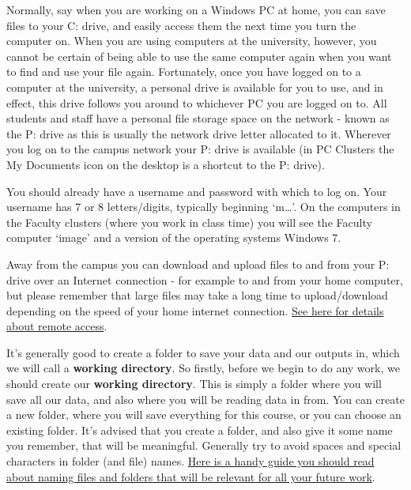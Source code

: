 \documentclass[]{book}
\theoremstyle{definition}
\theoremstyle{definition}
\theoremstyle{definition}
\theoremstyle{remark}
\begin{document}
Normally, say when you are working on a Windows PC at home, you can save
files to your C: drive, and easily access them the next time you turn
the computer on. When you are using computers at the university,
however, you cannot be certain of being able to use the same computer
again when you want to find and use your file again. Fortunately, once
you have logged on to a computer at the university, a personal drive is
available for you to use, and in effect, this drive follows you around
to whichever PC you are logged on to. All students and staff have a
personal file storage space on the network - known as the P: drive as
this is usually the network drive letter allocated to it. Wherever you
log on to the campus network your P: drive is available (in PC Clusters
the My Documents icon on the desktop is a shortcut to the P: drive).

You should already have a username and password with which to log on.
Your username has 7 or 8 letters/digits, typically beginning
`m\ldots{}'. On the computers in the Faculty clusters (where you work in
class time) you will see the Faculty computer `image' and a version of
the operating systems Windows 7.

Away from the campus you can download and upload files to and from your
P: drive over an Internet connection - for example to and from your home
computer, but please remember that large files may take a long time to
upload/download depending on the speed of your home internet connection.
\href{http://servicedesk.manchester.ac.uk/portal/app/portlets/results/viewsolution.jsp?solutionid=040918305513985\&SToken=A9F6241A4BCC47E813D7C92C68B579F7}{See
here for details about remote access}.

It's generally good to create a folder to save your data and our outputs
in, which we will call a \textbf{working directory}. So firstly, before
we begin to do any work, we should create our \textbf{working
directory}. This is simply a folder where you will save all our data,
and also where you will be reading data in from. You can create a new
folder, where you will save everything for this course, or you can
choose an existing folder. It's advised that you create a folder, and
also give it some name you remember, that will be meaningful. Generally
try to avoid spaces and special characters in folder (and file) names.
\href{http://www2.stat.duke.edu/~rcs46/lectures_2015/01-markdown-git/slides/naming-slides/naming-slides.pdf}{Here
is a handy guide you should read about naming files and folders that
will be relevant for all your future work}.
\end{document}

